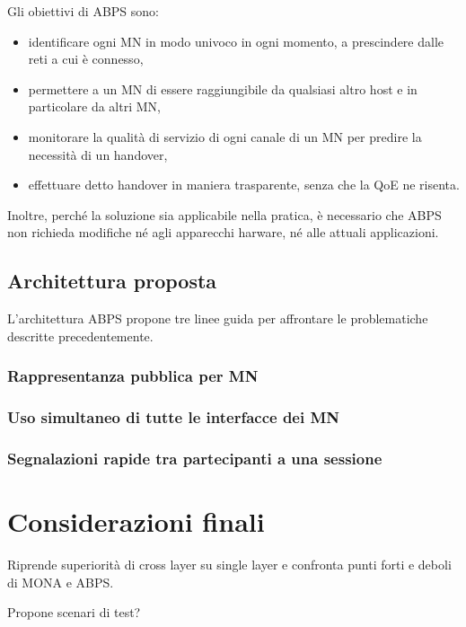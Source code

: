 \documentclass[12pt,a4paper,openright,twoside]{book}
\begin{document}
Gli obiettivi di ABPS sono:

\begin{itemize}
\item identificare ogni MN in modo univoco in ogni momento, a
  prescindere dalle reti a cui è connesso,
\item permettere a un MN di essere raggiungibile da qualsiasi altro
  host e in particolare da altri MN,
\item monitorare la qualità di servizio di ogni canale di un MN per
  predire la necessità di un handover,
\item effettuare detto handover in maniera trasparente, senza che la
  QoE ne risenta.
\end{itemize}

Inoltre, perché la soluzione sia applicabile nella pratica, è
necessario che ABPS non richieda modifiche né agli apparecchi harware,
né alle attuali applicazioni.

\section {Architettura proposta}
L'architettura ABPS propone tre linee guida per affrontare le
problematiche descritte precedentemente.

\subsection{Rappresentanza pubblica per MN}

\subsection{Uso simultaneo di tutte le interfacce dei MN}

\subsection{Segnalazioni rapide tra partecipanti a una sessione}

\clearpage{\pagestyle{empty}\cleardoublepage}


\chapter{Considerazioni finali}
Riprende superiorità di cross layer su single layer e confronta punti
forti e deboli di MONA e ABPS.

Propone scenari di test?

\clearpage{\pagestyle{empty}\cleardoublepage}
\end{document}
